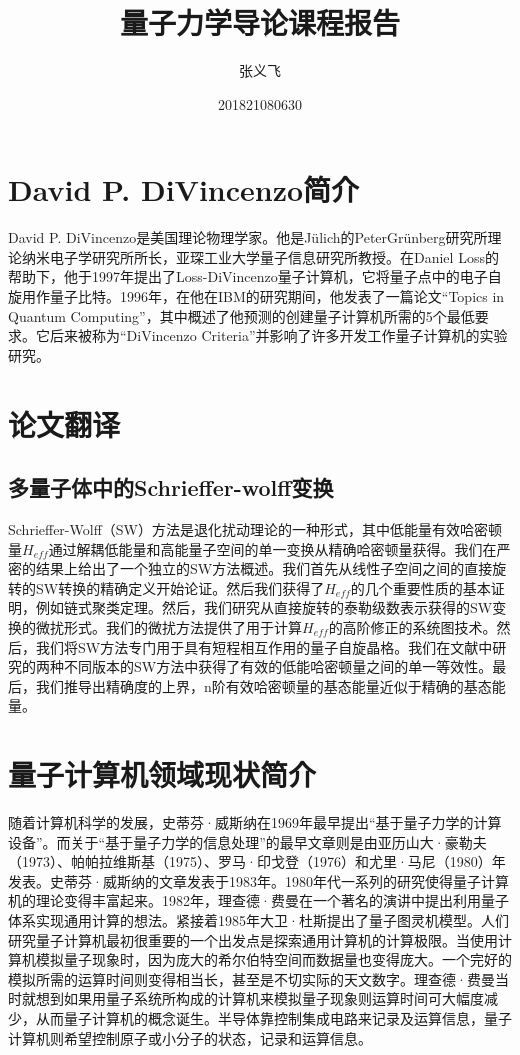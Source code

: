 \documentclass{article}
\title{量子力学导论课程报告}
\author{张义飞}
\date{201821080630}
\begin{document}
\maketitle

\section{David P. DiVincenzo简介}
David P. DiVincenzo是美国理论物理学家。他是Jülich的PeterGrünberg研究所理论纳米电子学研究所所长，亚琛工业大学量子信息研究所教授。在Daniel Loss的帮助下，他于1997年提出了Loss-DiVincenzo量子计算机，它将量子点中的电子自旋用作量子比特。1996年，在他在IBM的研究期间，他发表了一篇论文“Topics in Quantum Computing”，其中概述了他预测的创建量子计算机所需的5个最低要求。它后来被称为“DiVincenzo Criteria”并影响了许多开发工作量子计算机的实验研究。

\section{论文翻译}
\subsection{多量子体中的Schrieffer-wolff变换}

Schrieffer-Wolff（SW）方法是退化扰动理论的一种形式，其中低能量有效哈密顿量$H_{eff}$通过解耦低能量和高能量子空间的单一变换从精确哈密顿量获得。我们在严密的结果上给出了一个独立的SW方法概述。我们首先从线性子空间之间的直接旋转的SW转换的精确定义开始论证。然后我们获得了$H_{eff}$的几个重要性质的基本证明，例如链式聚类定理。然后，我们研究从直接旋转的泰勒级数表示获得的SW变换的微扰形式。我们的微扰方法提供了用于计算$H_{eff}$的高阶修正的系统图技术。然后，我们将SW方法专门用于具有短程相互作用的量子自旋晶格。我们在文献中研究的两种不同版本的SW方法中获得了有效的低能哈密顿量之间的单一等效性。最后，我们推导出精确度的上界，n阶有效哈密顿量的基态能量近似于精确的基态能量。

\section{量子计算机领域现状简介}
随着计算机科学的发展，史蒂芬·威斯纳在1969年最早提出“基于量子力学的计算设备”。而关于“基于量子力学的信息处理”的最早文章则是由亚历山大·豪勒夫（1973）、帕帕拉维斯基（1975）、罗马·印戈登（1976）和尤里·马尼（1980）年发表。史蒂芬·威斯纳的文章发表于1983年。1980年代一系列的研究使得量子计算机的理论变得丰富起来。1982年，理查德·费曼在一个著名的演讲中提出利用量子体系实现通用计算的想法。紧接着1985年大卫·杜斯提出了量子图灵机模型。人们研究量子计算机最初很重要的一个出发点是探索通用计算机的计算极限。当使用计算机模拟量子现象时，因为庞大的希尔伯特空间而数据量也变得庞大。一个完好的模拟所需的运算时间则变得相当长，甚至是不切实际的天文数字。理查德·费曼当时就想到如果用量子系统所构成的计算机来模拟量子现象则运算时间可大幅度减少，从而量子计算机的概念诞生。半导体靠控制集成电路来记录及运算信息，量子计算机则希望控制原子或小分子的状态，记录和运算信息。
\end{document}
